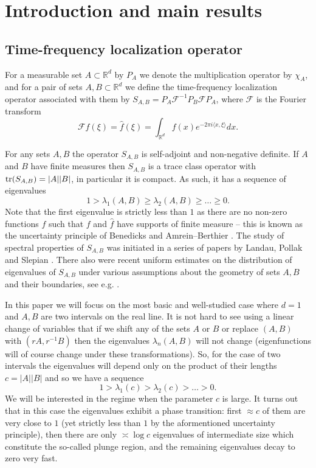 \documentclass[12pt]{amsart}
\numberwithin{equation}{section}
\newcommand{\R}{\mathbb{R}}
\newcommand{\F}{\mathcal{F}}
\begin{document}
  \section{Introduction and main results}
\subsection{Time-frequency localization operator}
For a measurable set $A\subset\R^d$ by $P_A$ we denote the multiplication operator by $\chi_A$, and for a pair of sets $A, B\subset \R^d$ we define the time-frequency localization operator associated with them by $S_{A, B} = P_A \F^{-1}P_B\F P_A$, where $\F$ is the Fourier transform
$$\F f(\xi) = \hat{f}(\xi)=\int_{\R^d}f(x) e^{-2\pi i \langle x, \xi\rangle}dx.$$

For any sets $A, B$ the operator $S_{A, B}$ is self-adjoint and non-negative definite. If $A$ and $B$ have finite measures then $S_{A, B}$ is a trace class operator with ${\rm tr}(S_{A,  B}) = |A| |B|$, in particular it is compact. As such, it has a sequence of eigenvalues $$1 > \lambda_1(A, B) \ge \lambda_2(A, B)\ge \ldots \ge 0.$$
Note that the first eigenvalue is strictly less than $1$ as there are no non-zero functions $f$ such that $f$ and $\hat{f}$ have supports of finite measure -- this is known as the uncertainty principle of Benedicks and Amrein--Berthier \cite{Benedicks, AB}. The study of spectral properties of $S_{A, B}$ was initiated in a series of papers by  Landau, Pollak and Slepian \cite{SPL1, SPL2, SPL3}. There also were recent uniform estimates on the distribution of eigenvalues of $S_{A, B}$ under various assumptions about the geometry of sets $A, B$ and their boundaries, see e.g. \cite{Mar}.
\medskip

In this paper we will focus on the most basic and well-studied case where $d = 1$ and $A, B$ are two intervals on the real line. It is not hard to see using a linear change of variables that if we shift any of the sets $A$ or $B$ or replace $(A, B)$ with $(rA, r^{-1}B)$ then the eigenvalues  $\lambda_n(A, B)$ will not change (eigenfunctions will of course change under these transformations). So, for the case of two intervals the eigenvalues will depend only on the product of their lengths $c = |A| |B|$ and so we have a sequence $$1 > \lambda_1(c) > \lambda_2(c) > \ldots > 0.$$
We will be interested in the regime when the parameter $c$ is large. It turns out that in this case the eigenvalues exhibit a phase transition: first $\approx c$ of them are very close to $1$ (yet strictly less than $1$ by the aformentioned uncertainty principle), then there are only $\asymp \log c$ eigenvalues of intermediate size which constitute the so-called plunge region, and the remaining eigenvalues decay to zero very fast.
\end{document}
